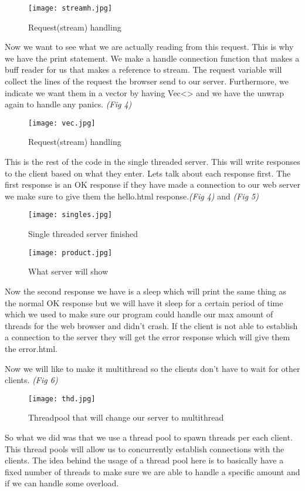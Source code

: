 \documentclass[conference]{IEEEtran}
\begin{document}
\begin{figure}
	\texttt{[image: streamh.jpg]}
	\caption{Request(stream) handling}
	\label{Request(stream) handling}
\end{figure}
Now we want to see what we are actually reading from this request. This is why we have the print statement. We make a handle connection function that makes a buff reader for us that makes a reference to stream. The request variable will collect the lines of the request the browser send to our server. Furthermore, we indicate we want them in a vector by having Vec<> and we have the unwrap again to handle any panics. \emph{(Fig 4)}
\begin{figure}
	\texttt{[image: vec.jpg]}
	\caption{Request(stream) handling}
	\label{Request(stream) handling}
\end{figure}
This is the rest of the code in the single threaded server. This will write responses to the client based on what they enter. Lets talk about each response first. The first response is an OK response if they have made a connection to our web server we make sure to give them the hello.html response.\emph{(Fig 4)} and \emph{(Fig 5)}
\begin{figure}
	\texttt{[image: singles.jpg]}
	\caption{Single threaded server finished}
	\label{Single threaded server finished}
\end{figure}
\begin{figure}
	\texttt{[image: product.jpg]}
	\caption{What server will show}
	\label{What server will show}
\end{figure}
Now the second response we have is a sleep which will print the same thing as the normal OK response but we will have it sleep for a certain period of time which we used to make sure our program could handle our max amount of threads for the web browser and didn’t crash. If the client is not able to establish a connection to the server they will get the error response which will give them the error.html.

Now we will like to make it multithread so the clients don’t have to wait for other clients.
\emph{(Fig 6)}
\begin{figure}
	\texttt{[image: thd.jpg]}
	\caption{Threadpool that will change our server to multithread}
	\label{Threadpool that will change our server to multithread}
\end{figure}
So what we did was that we use a thread pool to spawn threads per each client. This thread pools will allow us to concurrently establish connections with the clients. The idea behind the usage of a thread pool here is to basically have a fixed number of threads to make sure we are able to handle a specific amount and if we can handle some overload. 
\end{document}
